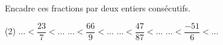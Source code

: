%
%
Encadre ces fractions par deux entiers consécutifs.
    \begin{tasks} (2)
        \task $ \dots < \dfrac{23}{7} < \dots $
        \task $ \dots < \dfrac{66}{9} < \dots $
        \task $ \dots < \dfrac{47}{87} < \dots $
        \task $ \dots < \dfrac{-51}{6} < \dots $
    \end{tasks}
